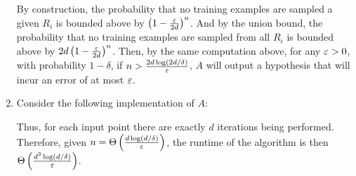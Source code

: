 \begin{solution}
\begin{enumerate}[label=(\alph*)]
        By construction, the probability that no training examples are sampled a given $R_i$ is bounded above by $\left(1-\frac{\varepsilon}{2d}\right)^n$. And by the union bound, the probability that no training examples are sampled from all $R_i$ is bounded above by $2d\left(1 - \frac{\varepsilon}{2d}\right)^n$. Then, by the same computation above, for any $\varepsilon > 0$, with probability $1 -\delta$, if $n > \frac{2d\log (2d/\delta)}{\varepsilon}$, $A$ will output a hypothesis that will incur an error of at most $\varepsilon$. 

        \item Consider the following implementation of $A$: 
        \begin{center}
        \end{center}
        Thus, for each input point there are exactly $d$ iterations being performed. Therefore, given $n = \Theta\left(\frac{d\log(d/\delta)}{\varepsilon}\right)$, the runtime of the algorithm is then $\Theta\left(\frac{d^2\log(d/\delta)}{\varepsilon}\right)$.
    \end{enumerate}
\end{solution}